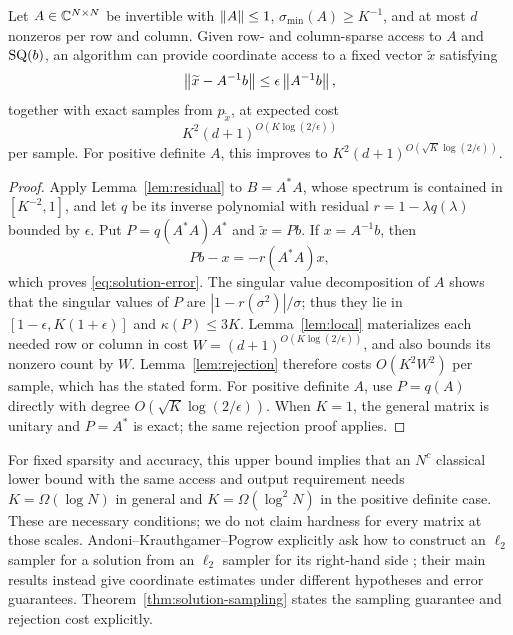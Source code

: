 \begin{theorem}\label{thm:solution-sampling}
Let $A\in\mathbb C^{N\times N}$ be invertible with
$\left\lVert A\right\rVert\leq1$, $\sigma_{\min}(A)\geq K^{-1}$, and at most $d$ nonzeros
per row and column. Given row- and column-sparse access to $A$ and
$\mathrm{SQ}(b)$, an algorithm can provide coordinate access to a fixed vector
$\widetilde x$ satisfying
\begin{equation}\label{eq:solution-error}
 \left\lVert\widetilde x-A^{-1}b\right\rVert\leq\epsilon\left\lVert A^{-1}b\right\rVert,
\end{equation}
together with exact samples from $p_{\widetilde x}$, at expected cost
\begin{equation}\label{eq:sampling-cost}
 K^2(d+1)^{O(K\log(2/\epsilon))}
\end{equation}
per sample. For positive definite $A$, this improves to
$K^2(d+1)^{O(\sqrt K\log(2/\epsilon))}$.
\end{theorem}
\begin{proof}
Apply Lemma~\ref{lem:residual} to $B=A^*A$, whose spectrum is contained
in $[K^{-2},1]$, and let $q$ be its inverse polynomial with residual
$r=1-\lambda q(\lambda)$ bounded by $\epsilon$. Put
$P=q(A^*A)A^*$ and $\widetilde x=Pb$. If $x=A^{-1}b$, then
\[
                  Pb-x=-r(A^*A)x,
\]
which proves \eqref{eq:solution-error}. The singular value decomposition of
$A$ shows that the singular values of $P$ are
$|1-r(\sigma^2)|/\sigma$; thus they lie in
$[1-\epsilon,K(1+\epsilon)]$ and $\kappa(P)\leq3K$.
Lemma~\ref{lem:local} materializes each needed row or column in cost
$W=(d+1)^{O(K\log(2/\epsilon))}$, and also bounds its nonzero count by
$W$. Lemma~\ref{lem:rejection} therefore costs $O(K^2W^2)$ per sample,
which has the stated form. For positive definite $A$, use $P=q(A)$ directly
with degree $O(\sqrt K\log(2/\epsilon))$. When $K=1$, the general matrix
is unitary and $P=A^*$ is exact; the same rejection proof applies.
\end{proof}

For fixed sparsity and accuracy, this upper bound implies that an $N^c$
classical lower bound with the same access and output requirement needs $K=\Omega(\log N)$ in general and
$K=\Omega(\log^2N)$ in the positive definite case. These are necessary
conditions; we do not claim hardness for every matrix at those scales.
Andoni--Krauthgamer--Pogrow explicitly ask how to construct an
$\ell_2$ sampler for a solution from an $\ell_2$ sampler for its right-hand
side \citep[Section~1.4]{AndoniKrauthgamerPogrow2019}; their main results
instead give coordinate estimates under different hypotheses and error
guarantees. Theorem~\ref{thm:solution-sampling} states the sampling guarantee and
rejection cost explicitly.

